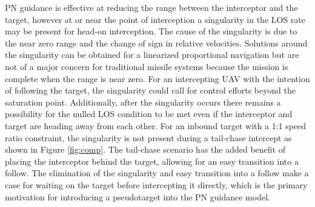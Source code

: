\documentclass[conference]{IEEEtran}
\begin{document}
PN guidance is effective at reducing the range between the interceptor and the target, however at or near the point of interception a singularity in the LOS rate may be present for head-on interception. The cause of the singularity is due to the near zero range and the change of sign in relative velocities. Solutions around the singularity can be obtained for a linearized proportional navigation \cite{singularitySolution} but are not of a major concern for traditional missile systems because the mission is complete when the range is near zero. For an intercepting UAV with the intention of following the target, the singularity could call for control efforts beyond the saturation point. Additionally, after the singularity occurs there remains a possibility for the nulled LOS condition to be met even if the interceptor and target are heading away from each other. For an inbound target with a 1:1 speed ratio constraint, the singularity is not present during a tail-chase intercept as shown in Figure \ref{fig:comp}. The tail-chase scenario has the added benefit of placing the interceptor behind the target, allowing for an easy transition into a follow. The elimination of the singularity and easy transition into a follow make a case for waiting on the target before intercepting it directly, which is the primary motivation for introducing a pseudotarget into the PN guidance model.




\end{document}
